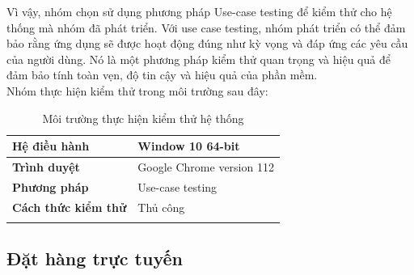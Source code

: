 Vì vậy, nhóm chọn sử dụng phương pháp Use-case testing để kiểm thử cho hệ thống mà nhóm đã phát triển. Với use case testing, nhóm phát triển có thể đảm bảo rằng ứng dụng sẽ được hoạt động đúng như kỳ vọng và đáp ứng các yêu cầu của người dùng. Nó là một phương pháp kiểm thử quan trọng và hiệu quả để đảm bảo tính toàn vẹn, độ tin cậy và hiệu quả của phần mềm.\\

\hspace*{0.5cm}Nhóm thực hiện kiểm thử trong môi trường sau đây:
\\
{
\setlength\extrarowheight{6pt}
\begin{longtable}{| p{} | p{} |}
    \hline
    \textbf{Hệ điều hành}       & Window 10 64-bit          \\
    \hline
    \textbf{Trình duyệt}        & Google Chrome version 112 \\
    \hline
    \textbf{Phương pháp}        & Use-case testing          \\
    \hline
    \textbf{Cách thức kiểm thử} & Thủ công                  \\
    \hline
    \caption{Môi trường thực hiện kiểm thử hệ thống}
\end{longtable}
}

\subsection{Đặt hàng trực tuyến}

